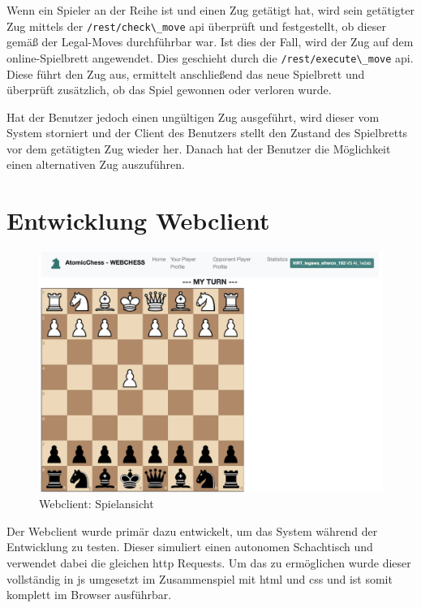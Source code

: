 Wenn ein Spieler an der Reihe ist und einen Zug getätigt hat, wird sein
getätigter Zug mittels der \passthrough{\lstinline!/rest/check\_move!}
\gls{api} überprüft und festgestellt, ob dieser gemäß der Legal-Moves
durchführbar war. Ist dies der Fall, wird der Zug auf dem
online-Spielbrett angewendet. Dies geschieht durch die
\passthrough{\lstinline!/rest/execute\_move!} \gls{api}. Diese führt den
Zug aus, ermittelt anschließend das neue Spielbrett und überprüft
zusätzlich, ob das Spiel gewonnen oder verloren wurde.

Hat der Benutzer jedoch einen ungültigen Zug ausgeführt, wird dieser vom
System storniert und der Client des Benutzers stellt den Zustand des
Spielbretts vor dem getätigten Zug wieder her. Danach hat der Benutzer
die Möglichkeit einen alternativen Zug auszuführen.

\hypertarget{entwicklung-webclient}{%
\section{Entwicklung Webclient}\label{entwicklung-webclient}}

\begin{figure}
\centering
\includegraphics{images/ATC_webclient.png}
\caption{Webclient: Spielansicht \label{ATC_webclient}}
\end{figure}

Der Webclient wurde primär dazu entwickelt, um das System während der
Entwicklung zu testen. Dieser simuliert einen autonomen Schachtisch und
verwendet dabei die gleichen \gls{http} Requests. Um das zu ermöglichen
wurde dieser vollständig in \gls{js} umgesetzt im Zusammenspiel mit
\gls{html} und \gls{css} und ist somit komplett im Browser ausführbar.

